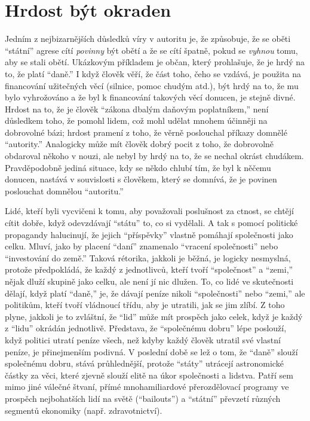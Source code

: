 \documentclass{book}
\begin{document}
\section{Hrdost být okraden}

Jedním z nejbizarnějších důsledků víry v autoritu je, že způsobuje, že se oběti \enquote{státní} agrese cítí \emph{povinny} být obětí a že se cítí špatně, pokud se \emph{vyhnou} tomu, aby se stali obětí. Ukázkovým příkladem je občan, který prohlašuje, že je hrdý na to, že platí \enquote{daně.} I když člověk věří, že část toho, čeho se vzdává, je použita na financování užitečných věcí (silnice, pomoc chudým atd.), být hrdý na to, že mu bylo vyhrožováno a že byl k financování takových věcí donucen, je stejně divné. Hrdost na to, že je člověk \enquote{zákona dbalým daňovým poplatníkem,} není důsledkem toho, že pomohl lidem, což mohl udělat mnohem účinněji na dobrovolné bázi; hrdost pramení z toho, že věrně poslouchal příkazy domnělé \enquote{autority.} Analogicky může mít člověk dobrý pocit z toho, že dobrovolně obdaroval někoho v nouzi, ale nebyl by hrdý na to, že se nechal okrást chudákem. Pravděpodobně jediná situace, kdy se někdo chlubí tím, že byl k něčemu donucen, nastává v souvislosti s člověkem, který se domnívá, že je povinen poslouchat domnělou \enquote{autoritu.}

Lidé, kteří byli vycvičeni k tomu, aby považovali poslušnost za ctnost, se chtějí cítit dobře, když odevzdávají \enquote{státu} to, co si vydělali. A tak s pomocí politické propagandy halucinují, že jejich \enquote{příspěvky} vlastně pomáhají společnosti jako celku. Mluví, jako by placení \enquote{daní} znamenalo \enquote{vracení společnosti} nebo \enquote{investování do země.} Taková rétorika, jakkoli je běžná, je logicky nesmyslná, protože předpokládá, že každý z jednotlivců, kteří tvoří \enquote{společnost} a \enquote{zemi,} nějak dluží skupině jako celku, ale není jí nic dlužen. To, co lidé ve skutečnosti dělají, když platí \enquote{daně,} je, že dávají peníze nikoli \enquote{společnosti} nebo \enquote{zemi,} ale politikům, kteří tvoří vládnoucí třídu, aby je utratili, jak se jim zlíbí. Z toho plyne, jakkoli je to zvláštní, že \enquote{lid} může mít prospěch jako celek, když je každý z \enquote{lidu} okrádán jednotlivě. Představa, že \enquote{společnému dobru} lépe poslouží, když politici utratí peníze všech, než kdyby každý člověk utratil své vlastní peníze, je přinejmenším podivná. V poslední době se lež o tom, že \enquote{daně} slouží společnému dobru, stává průhlednější, protože \enquote{státy} utrácejí astronomické částky za věci, které zjevně slouží elitě na úkor společnosti a lidstva. Patří sem mimo jiné válečné štvaní, přímé mnohamiliardové přerozdělovací programy ve prospěch nejbohatších lidí na světě (\enquote{bailouts}) a \enquote{státní} převzetí různých segmentů ekonomiky (např. zdravotnictví).
\end{document}
